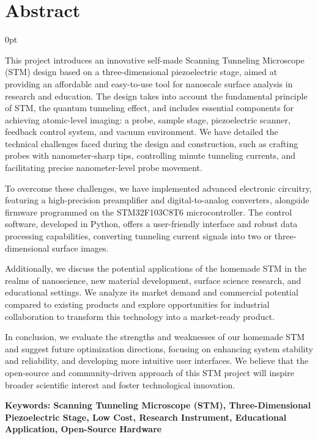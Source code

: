 \documentclass[zihao=-4]{ctexart}
\newcommand{\setParDis}{\setlength {\parskip} {0pt} }
\begin{document}
\section*{\textbf{Abstract}} %
{}
\begin{spacing}{1.5}
\begin{adjustwidth}{0.42cm}{0.42cm}
  \setParDis %

\qquad This project introduces an innovative self-made Scanning Tunneling Microscope (STM) design based on a three-dimensional piezoelectric stage, aimed at providing an affordable and easy-to-use tool for nanoscale surface analysis in research and education. The design takes into account the fundamental principle of STM, the quantum tunneling effect, and includes essential components for achieving atomic-level imaging: a probe, sample stage, piezoelectric scanner, feedback control system, and vacuum environment. We have detailed the technical challenges faced during the design and construction, such as crafting probes with nanometer-sharp tips, controlling minute tunneling currents, and facilitating precise nanometer-level probe movement.

To overcome these challenges, we have implemented advanced electronic circuitry, featuring a high-precision preamplifier and digital-to-analog converters, alongside firmware programmed on the STM32F103C8T6 microcontroller. The control software, developed in Python, offers a user-friendly interface and robust data processing capabilities, converting tunneling current signals into two or three-dimensional surface images.

Additionally, we discuss the potential applications of the homemade STM in the realms of nanoscience, new material development, surface science research, and educational settings. We analyze its market demand and commercial potential compared to existing products and explore opportunities for industrial collaboration to transform this technology into a market-ready product.

In conclusion, we evaluate the strengths and weaknesses of our homemade STM and suggest future optimization directions, focusing on enhancing system stability and reliability, and developing more intuitive user interfaces. We believe that the open-source and community-driven approach of this STM project will inspire broader scientific interest and foster technological innovation.


\textbf{Keywords: Scanning Tunneling Microscope (STM), Three-Dimensional Piezoelectric Stage, Low Cost, Research Instrument, Educational Application, Open-Source Hardware}
\end{adjustwidth}
\end{spacing}
\end{document}
